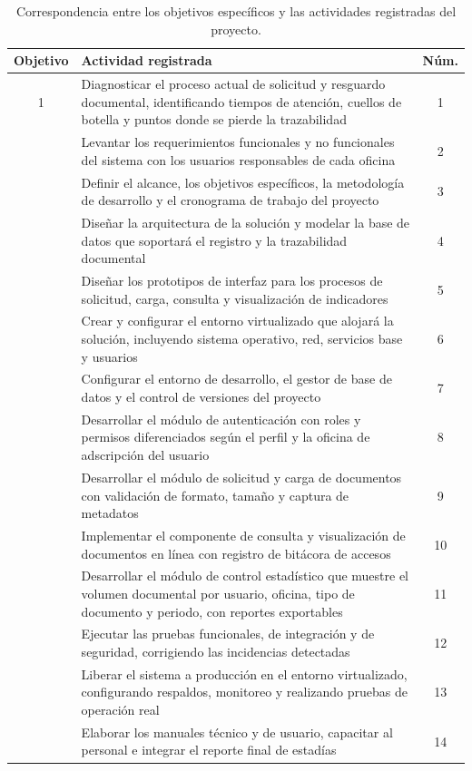 \begin{table}[H]
  \centering
  \footnotesize
  \setlength{\tabcolsep}{5pt}
  \renewcommand{\arraystretch}{1.2}
  \caption{Correspondencia entre los objetivos específicos y las actividades registradas del proyecto.}
  \label{tab:objetivos_actividades}
  \begin{tabularx}{\textwidth}{@{}c>{\raggedright\arraybackslash}Xc@{}}
    \toprule
    \textbf{Objetivo} & \textbf{Actividad registrada} & \textbf{Núm.} \\
    \midrule
    1 & Diagnosticar el proceso actual de solicitud y resguardo documental, identificando tiempos de atención, cuellos de botella y puntos donde se pierde la trazabilidad & 1 \\
    \addlinespace[0.35em]
    2 & Levantar los requerimientos funcionales y no funcionales del sistema con los usuarios responsables de cada oficina & 2 \\
     & Definir el alcance, los objetivos específicos, la metodología de desarrollo y el cronograma de trabajo del proyecto & 3 \\
    \addlinespace[0.35em]
    3 & Diseñar la arquitectura de la solución y modelar la base de datos que soportará el registro y la trazabilidad documental & 4 \\
     & Diseñar los prototipos de interfaz para los procesos de solicitud, carga, consulta y visualización de indicadores & 5 \\
    \addlinespace[0.35em]
    4 & Crear y configurar el entorno virtualizado que alojará la solución, incluyendo sistema operativo, red, servicios base y usuarios & 6 \\
     & Configurar el entorno de desarrollo, el gestor de base de datos y el control de versiones del proyecto & 7 \\
    \addlinespace[0.35em]
    5 & Desarrollar el módulo de autenticación con roles y permisos diferenciados según el perfil y la oficina de adscripción del usuario & 8 \\
     & Desarrollar el módulo de solicitud y carga de documentos con validación de formato, tamaño y captura de metadatos & 9 \\
     & Implementar el componente de consulta y visualización de documentos en línea con registro de bitácora de accesos & 10 \\
     & Desarrollar el módulo de control estadístico que muestre el volumen documental por usuario, oficina, tipo de documento y periodo, con reportes exportables & 11 \\
    \addlinespace[0.35em]
    6 & Ejecutar las pruebas funcionales, de integración y de seguridad, corrigiendo las incidencias detectadas & 12 \\
     & Liberar el sistema a producción en el entorno virtualizado, configurando respaldos, monitoreo y realizando pruebas de operación real & 13 \\
     & Elaborar los manuales técnico y de usuario, capacitar al personal e integrar el reporte final de estadías & 14 \\
    \bottomrule
  \end{tabularx}
\end{table}

